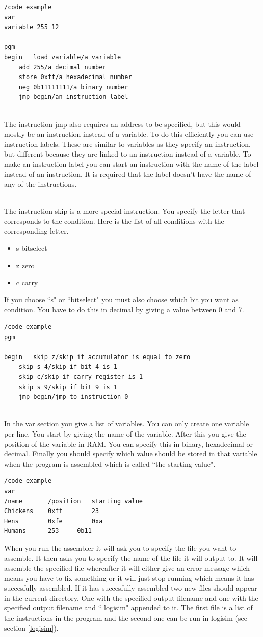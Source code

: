 \documentclass{article}
\begin{document}
\begin{lstlisting}
/code example
var
variable 255 12

pgm
begin	load variable/a variable
	add 255/a decimal number
	store 0xff/a hexadecimal number
	neg 0b11111111/a binary number
	jmp begin/an instruction label
\end{lstlisting}
~\\
The instruction jmp also requires an address to be specified, but this would mostly be an instruction instead of a variable. To do this efficiently you can use instruction labels. These are similar to variables as they specify an instruction, but different because they are linked to an instruction instead of a variable. To make an instruction label you can start an instruction with the name of the label instead of an instruction. It is required that the label doesn't have the name of any of the instructions.

~\\
The instruction skip is a more special instruction. You specify the letter that corresponds to the condition. Here is the list of all conditions with the corresponding letter.
\begin{itemize}
	\item{s	bitselect}
	\item{z	zero}
	\item{c	carry}
\end{itemize}
If you choose ``s" or ``bitselect" you must also choose which bit you want as condition. You have to do this in decimal by giving a value between 0 and 7.
\begin{lstlisting}
/code example
pgm

begin	skip z/skip if accumulator is equal to zero
	skip s 4/skip if bit 4 is 1
	skip c/skip if carry register is 1
	skip s 9/skip if bit 9 is 1
	jmp begin/jmp to instruction 0
\end{lstlisting}
~\\
In the var section you give a list of variables. You can only create one variable per line. You start by giving the name of the variable. After this you give the position of the variable in RAM. You can specify this in binary, hexadecimal or decimal. Finally you should specify which value should be stored in that variable when the program is assembled which is called ``the starting value".
\begin{lstlisting}
/code example
var
/name		/position	starting value
Chickens	0xff		23
Hens		0xfe		0xa
Humans		253		0b11
\end{lstlisting}
When you run the assembler it will ask you to specify the file you want to assemble. It then asks you to specify the name of the file it will output to. It will assemble the specified file whereafter it will either give an error message which means you have to fix something or it will just stop running which means it has succesfully assembled. If it has succesfully assembled two new files should appear in the current directory. One with the specified output filename and one with the specified output filename and `` logisim" appended to it. The first file is a list of the instructions in the program and the second one can be run in logisim (see section \ref{logisim}).
\end{document}
